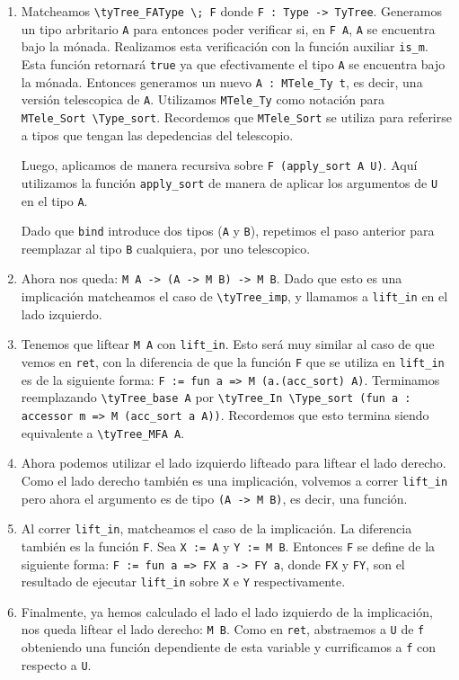 \begin{enumerate}
    \item Matcheamos \lstinline{\tyTree_FAType \; F} donde \lstinline{F : Type -> TyTree}. Generamos un tipo arbritario \lstinline{A} para entonces poder verificar si, en \lstinline{F A}, \lstinline{A} se encuentra bajo la mónada. Realizamos esta verificación con la función auxiliar \lstinline{is_m}. Esta función retornará \lstinline{true} ya que efectivamente el tipo \lstinline{A} se encuentra bajo la mónada. Entonces generamos un nuevo \lstinline{A : MTele_Ty t}, es decir, una versión telescopica de \lstinline{A}. Utilizamos \lstinline{MTele_Ty} como notación para \lstinline{MTele_Sort \Type_sort}. Recordemos que \lstinline{MTele_Sort} se utiliza para referirse a tipos que tengan las depedencias del telescopio.
    
    Luego, aplicamos \lift de manera recursiva sobre \lstinline{F (apply_sort A U)}. Aquí utilizamos la función \lstinline{apply_sort} de manera de aplicar los argumentos de \lstinline{U} en el tipo \lstinline{A}.

    Dado que \lstinline{bind} introduce dos tipos (\lstinline{A} y \lstinline{B}), repetimos el paso anterior para reemplazar al tipo \lstinline{B} cualquiera, por uno telescopico.
    \item Ahora nos queda: \lstinline{M A -> (A -> M B) -> M B}. Dado que esto es una implicación matcheamos el caso de \lstinline{\tyTree_imp}, y llamamos a \lstinline{lift_in} en el lado izquierdo.
    \item Tenemos que liftear \lstinline{M A} con \lstinline{lift_in}. Esto será muy similar al caso de que vemos en \lstinline{ret}, con la diferencia de que la función \lstinline{F} que se utiliza en \lstinline{lift_in} es de la siguiente forma: \lstinline{F := fun a => M (a.(acc_sort) A)}. Terminamos reemplazando \lstinline{\tyTree_base A} por \lstinline{\tyTree_In \Type_sort (fun a : accessor m => M (acc_sort a A))}. Recordemos que esto termina siendo equivalente a \lstinline{\tyTree_MFA A}.
    \item Ahora podemos utilizar el lado izquierdo lifteado para liftear el lado derecho. Como el lado derecho también es una implicación, volvemos a correr \lstinline{lift_in} pero ahora el argumento es de tipo \lstinline{(A -> M B)}, es decir, una función.
    \item Al correr \lstinline{lift_in}, matcheamos el caso de la implicación. La diferencia también es la función \lstinline{F}. Sea \lstinline{X := A} y \lstinline{Y := M B}. Entonces \lstinline{F} se define de la siguiente forma: \lstinline{F := fun a => FX a -> FY a}, donde \lstinline{FX} y \lstinline{FY}, son el resultado de ejecutar \lstinline{lift_in} sobre \lstinline{X} e \lstinline{Y} respectivamente.
    \item Finalmente, ya hemos calculado el lado el lado izquierdo de la implicación, nos queda liftear el lado derecho: \lstinline{M B}.
    Como en \lstinline{ret}, abstraemos a \lstinline{U} de \lstinline{f} obteniendo una función dependiente de esta variable y currificamos a \lstinline{f} con respecto a \lstinline{U}.
    

\end{enumerate}
